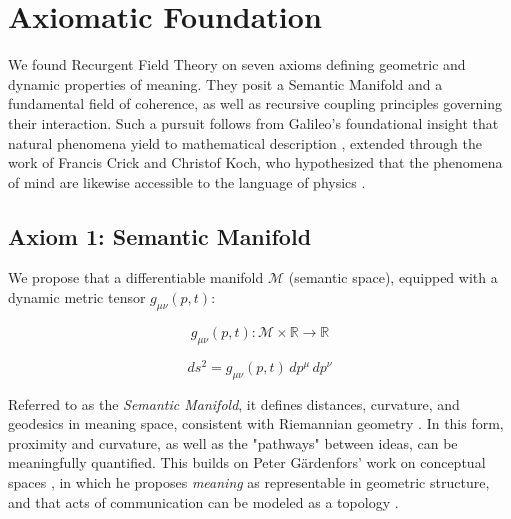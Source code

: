 \chapter{Axiomatic Foundation}
\label{1:axiomatic_foundation}

We found Recurgent Field Theory on seven axioms defining geometric and dynamic properties of meaning. They posit a Semantic Manifold and a fundamental field of coherence, as well as recursive coupling principles governing their interaction. Such a pursuit follows from Galileo's foundational insight that natural phenomena yield to mathematical description \autocite{Galilei1623}, extended through the work of Francis Crick and Christof Koch, who hypothesized that the phenomena of mind are likewise accessible to the language of physics \autocite{Crick1990, KochConsciousness2019}.


\section{Axiom 1: Semantic Manifold}
\label{1.1:axiom_1_semantic_manifold}

We propose that a differentiable manifold \(\mathcal{M}\) (semantic space), equipped with a dynamic metric tensor \(g_{\mu\nu}(p,t)\):

\begin{equation}
g_{\mu\nu}(p,t) : \mathcal{M} \times \mathbb{R} \rightarrow \mathbb{R}
\end{equation}

\begin{equation}
ds^2 = g_{\mu\nu}(p,t) \, dp^\mu \, dp^\nu
\end{equation}

Referred to as the \textit{Semantic Manifold}, it defines distances, curvature, and geodesics in meaning space, consistent with Riemannian geometry \autocite{Riemann1868}. In this form, proximity and curvature, as well as the "pathways" between ideas, can be meaningfully quantified. This builds on Peter Gärdenfors' work on conceptual spaces \autocite{Gardenfors2000}, in which he proposes \textit{meaning} as representable in geometric structure, and that acts of communication can be modeled as a topology \autocite{Gardenfors2014}.


